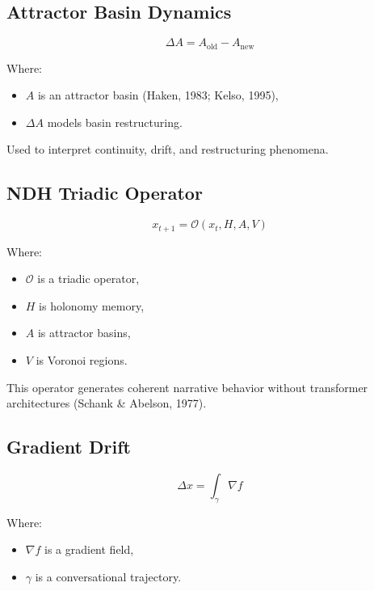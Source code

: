 \subsection*{Attractor Basin Dynamics}
\[
\Delta A = A_{\mathrm{old}} - A_{\mathrm{new}}
\]

Where:
\begin{itemize}[noitemsep]
    \item $A$ is an attractor basin (Haken, 1983; Kelso, 1995),
    \item $\Delta A$ models basin restructuring.
\end{itemize}

Used to interpret continuity, drift, and restructuring phenomena.


\subsection*{NDH Triadic Operator}
\[
x_{t+1} = \mathcal{O}(x_t, H, A, V)
\]

Where:
\begin{itemize}[noitemsep]
    \item $\mathcal{O}$ is a triadic operator,
    \item $H$ is holonomy memory,
    \item $A$ is attractor basins,
    \item $V$ is Voronoi regions.
\end{itemize}

This operator generates coherent narrative behavior without transformer
architectures (Schank \& Abelson, 1977).


\subsection*{Gradient Drift}
\[
\Delta x = \int_{\gamma} \nabla f
\]

Where:
\begin{itemize}[noitemsep]
    \item $\nabla f$ is a gradient field,
    \item $\gamma$ is a conversational trajectory.
\end{itemize}

